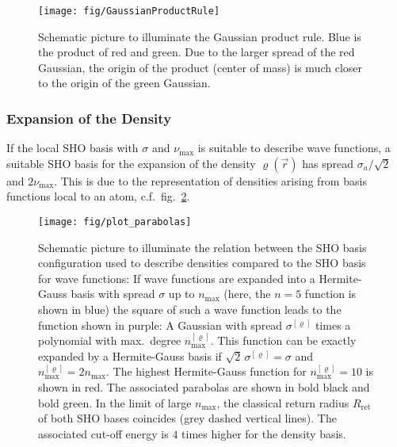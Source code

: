 \documentclass[oribibl]{llncs}
\newcommand{\um}[1]{_{\mathrm{#1}}}
\begin{document}
%
\begin{figure}
  \begin{minipage}[c]{.990\textwidth}
	\texttt{[image: fig/GaussianProductRule]} %
  \end{minipage}\hfill
  \begin{minipage}[c]{.009\textwidth}
  \end{minipage}
  \label{fig:GaussianProductRule}
  \caption{
Schematic picture to illuminate the Gaussian product rule. Blue is the product of red and green.
Due to the larger spread of the red Gaussian, the origin of the product (center of mass) is much closer to
the origin of the green Gaussian.
  }
\end{figure}
%
%


\subsubsection{Expansion of the Density}
If the local \ac{SHO} basis with $\sigma$ and $\nu\um{max}$
is suitable to describe wave functions, 
a suitable \ac{SHO} basis for the expansion of the density $\varrho(\vec r)$ has
spread $\sigma_a/\sqrt{2}$ and $2\nu\um{max}$.
This is due to the representation of densities
arising from basis functions local to an atom, c.f.~fig.~\ref{fig:plot_parabolas}.
%
\begin{figure}
  \begin{minipage}[c]{.990\textwidth}
	\texttt{[image: fig/plot\_parabolas]} %
  \end{minipage}\hfill
  \begin{minipage}[c]{.009\textwidth}
  \end{minipage}
  \label{fig:plot_parabolas}
  \caption{
Schematic picture to illuminate the relation between the \ac{SHO} basis configuration 
used to describe densities
compared to the \ac{SHO} basis for wave functions:
If wave functions are expanded into a Hermite-Gauss basis with spread $\sigma$
up to $n\um{max}$ (here, the $n = 5$ function is shown in blue)
the square of such a wave function leads to the function shown in purple:
A Gaussian with spread $\sigma^{[\varrho]}$ times a polynomial with max.~degree $n\um{max}^{[\varrho]}$.
This function can be exactly expanded by a Hermite-Gauss basis if
$\sqrt{2}\,\sigma^{[\varrho]} = \sigma$
and
$n\um{max}^{[\varrho]} = 2n\um{max}$.
The highest Hermite-Gauss function for $n\um{max}^{[\varrho]} = 10$ is shown in red.
The associated parabolas are shown in bold black and bold green.
In the limit of large $n\um{max}$, the classical return radius $R\um{ret}$
of both \ac{SHO} bases coincides (grey dashed vertical lines).
The associated cut-off energy is $4$ times higher for the density basis.
  }
\end{figure}
%
%
\end{document}
